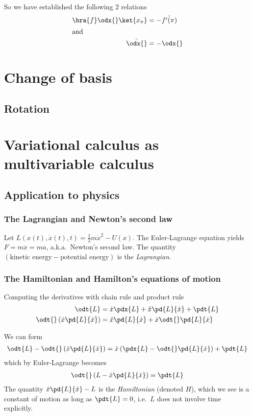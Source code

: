 \documentclass[12pt, oneside, letterpaper, fleqn]{article}
\begin{document}
So we have established the following $2$ relations
\begin{align}
\bra{f}\odx{}\ket{x_\pi} &= -\bar{f'(\pi)}\\
\intertext{and}
\bar{\odx{}} &= -\odx{}
\end{align}

\section{Change of basis}
\subsection{Rotation}


\section{Variational calculus as multivariable calculus}
\subsection{Application to physics}
\subsubsection{The Lagrangian and Newton's second law}
Let $L(x(t), \dot{x}(t), t) = \frac{1}{2}m\dot{x}^2 - U(x)$. The
Euler-Lagrange equation yields $F = m\ddot{x} = ma$, a.k.a.\ Newton's
second law. The quantity $(\text{kinetic energy} - \text{potential
energy})$ is the \emph{Lagrangian}.

\subsubsection{The Hamiltonian and Hamilton's equations of motion}
Computing the derivatives with chain rule and product rule
\begin{align*}
\odt{L} &= \dot{x}\pdx{L} + \ddot{x}\pd{L}{\dot{x}} + \pdt{L}\\
\odt{}\left(\dot{x}\pd{L}{\dot{x}}\right) &= \ddot{x}\pd{L}{\dot{x}} +
\dot{x}\odt{}\pd{L}{\dot{x}}
\end{align*}

We can form
\begin{align*}
\odt{L} - \odt{}\left(\dot{x}\pd{L}{\dot{x}}\right) =
\dot{x}\left(\pdx{L} - \odt{}\pd{L}{\dot{x}}\right) + \pdt{L}
\end{align*}
which by Euler-Lagrange becomes
\begin{align*}
\odt{}\left(L - \dot{x}\pd{L}{\dot{x}}\right) = \pdt{L}
\end{align*}
The quantity $\dot{x}\pd{L}{\dot{x}} - L$ is the
\emph{Hamiltonian} (denoted $H$), which we see is a constant of motion
as long as $\pdt{L} = 0$, i.e.\ $L$ does not involve time explicitly.
\end{document}
